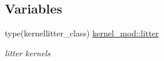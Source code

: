\subsection*{Variables}
\begin{DoxyCompactItemize}
\item 
type(kernellitter\+\_\+class) \mbox{\hyperlink{namespacekernel__mod_a787f41bde87184610d6f926a6aaa704d}{kernel\+\_\+mod\+::litter}}
\begin{DoxyCompactList}\small\item\em litter kernels \end{DoxyCompactList}\end{DoxyCompactItemize}
